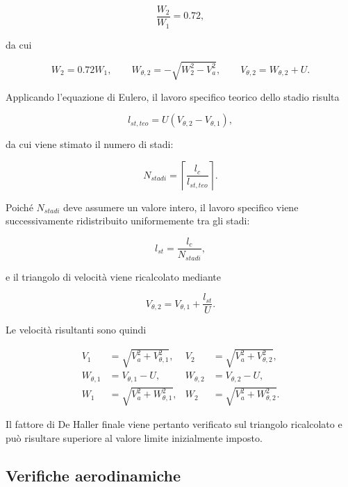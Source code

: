 \begin{equation*}
\frac{W_2}{W_1}=0.72,
\end{equation*}

da cui

\begin{equation*}
W_2=0.72W_1,
\qquad
W_{\theta,2}=-\sqrt{W_2^2-V_a^2},
\qquad
V_{\theta,2}=W_{\theta,2}+U.
\end{equation*}

Applicando l'equazione di Eulero, il lavoro specifico teorico dello
stadio risulta

\begin{equation*}
l_{st,teo}=U(V_{\theta,2}-V_{\theta,1}),
\end{equation*}

da cui viene stimato il numero di stadi:

\begin{equation*}
N_{stadi}
=
\left\lceil
\frac{l_c}{l_{st,teo}}
\right\rceil.
\end{equation*}

Poiché $N_{stadi}$ deve assumere un valore intero, il lavoro specifico
viene successivamente ridistribuito uniformemente tra gli stadi:

\begin{equation*}
l_{st}=\frac{l_c}{N_{stadi}},
\end{equation*}

e il triangolo di velocità viene ricalcolato mediante

\begin{equation*}
V_{\theta,2}
=
V_{\theta,1}+\frac{l_{st}}{U}.
\end{equation*}

Le velocità risultanti sono quindi

\begin{align*}
V_1 &= \sqrt{V_a^2+V_{\theta,1}^2}, &
V_2 &= \sqrt{V_a^2+V_{\theta,2}^2},\\
W_{\theta,1} &= V_{\theta,1}-U, &
W_{\theta,2} &= V_{\theta,2}-U,\\
W_1 &= \sqrt{V_a^2+W_{\theta,1}^2}, &
W_2 &= \sqrt{V_a^2+W_{\theta,2}^2}.
\end{align*}

Il fattore di De Haller finale viene pertanto verificato sul triangolo
ricalcolato e può risultare superiore al valore limite inizialmente
imposto.


\subsection{Verifiche aerodinamiche}

